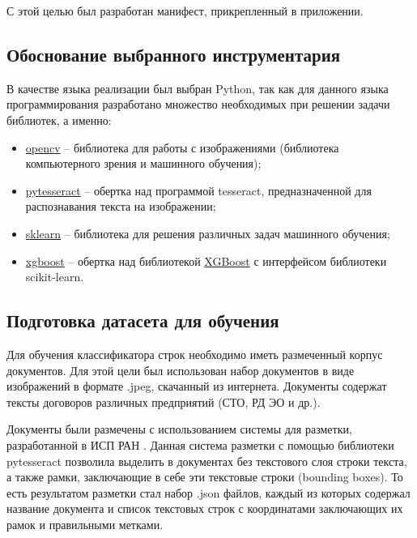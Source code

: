 \documentclass[a4paper,12pt]{article}
\begin{document}
С этой целью был разработан манифест, прикрепленный в приложении.

\subsection{Обоснование выбранного инструментария}

В качестве языка реализации был выбран Python, так как для данного языка программирования разработано множество необходимых при решении задачи библиотек, а именно:

\begin{itemize}
\item \href{https://opencv.org}{opencv} -- библиотека для работы с изображениями (библиотека компьютерного зрения и машинного обучения);
\item \href{https://pypi.org/project/pytesseract/}{pytesseract} -- обертка над программой tesseract, предназначенной для распознавания текста на изображении;
\item \href{https://scikit-learn.org}{sklearn} -- библиотека для решения различных задач машинного обучения;
\item \href{https://xgboost.readthedocs.io/en/latest/python/python_api.html#module-xgboost.sklearn}{xgboost} -- обертка над библиотекой \href{https://xgboost.readthedocs.io/en/latest/index.html}{XGBoost} с интерфейсом  библиотеки scikit-learn. 
\end{itemize}

\subsection{Подготовка датасета для обучения}

Для обучения классификатора строк необходимо иметь размеченный корпус документов. Для этой цели был использован набор документов в виде изображений в формате .jpeg, скачанный из интернета. Документы содержат тексты договоров различных предприятий (СТО, РД ЭО и др.). 

Документы были размечены с использованием системы для разметки, разработанной в ИСП РАН \cite{link8}. Данная система разметки с помощью библиотеки pytesseract позволила выделить в документах без текстового слоя строки текста, а также рамки, заключающие в себе эти текстовые строки (bounding boxes). То есть результатом разметки стал набор .json файлов, каждый из которых содержал название документа и список текстовых строк с координатами заключающих их рамок и правильными метками.
\end{document}
